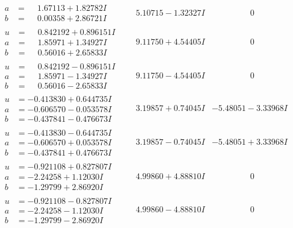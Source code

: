 \documentclass[1p]{elsarticle_modified}
\theoremstyle{definition}
\begin{document}
$$\begin{array}{c|c|c}
\begin{aligned}
a &= \phantom{-}1.67113 + 1.82782 I \\
b &= \phantom{-}0.00358 + 2.86721 I\end{aligned}
 & \phantom{-}5.10715 - 1.32327 I & \phantom{-0.000000 } 0 \\ \hline\begin{aligned}
u &= \phantom{-}0.842192 + 0.896151 I \\
a &= \phantom{-}1.85971 + 1.34927 I \\
b &= \phantom{-}0.56016 + 2.65833 I\end{aligned}
 & \phantom{-}9.11750 + 4.54405 I & \phantom{-0.000000 } 0 \\ \hline\begin{aligned}
u &= \phantom{-}0.842192 - 0.896151 I \\
a &= \phantom{-}1.85971 - 1.34927 I \\
b &= \phantom{-}0.56016 - 2.65833 I\end{aligned}
 & \phantom{-}9.11750 - 4.54405 I & \phantom{-0.000000 } 0 \\ \hline\begin{aligned}
u &= -0.413830 + 0.644735 I \\
a &= -0.606570 - 0.053578 I \\
b &= -0.437841 - 0.476673 I\end{aligned}
 & \phantom{-}3.19857 + 0.74045 I & -5.48051 - 3.33968 I \\ \hline\begin{aligned}
u &= -0.413830 - 0.644735 I \\
a &= -0.606570 + 0.053578 I \\
b &= -0.437841 + 0.476673 I\end{aligned}
 & \phantom{-}3.19857 - 0.74045 I & -5.48051 + 3.33968 I \\ \hline\begin{aligned}
u &= -0.921108 + 0.827807 I \\
a &= -2.24258 + 1.12030 I \\
b &= -1.29799 + 2.86920 I\end{aligned}
 & \phantom{-}4.99860 + 4.88810 I & \phantom{-0.000000 } 0 \\ \hline\begin{aligned}
u &= -0.921108 - 0.827807 I \\
a &= -2.24258 - 1.12030 I \\
b &= -1.29799 - 2.86920 I\end{aligned}
 & \phantom{-}4.99860 - 4.88810 I & \phantom{-0.000000 } 0 \\ \hline\begin{aligned}

\end{aligned}
\end{array}$$
\end{document}
